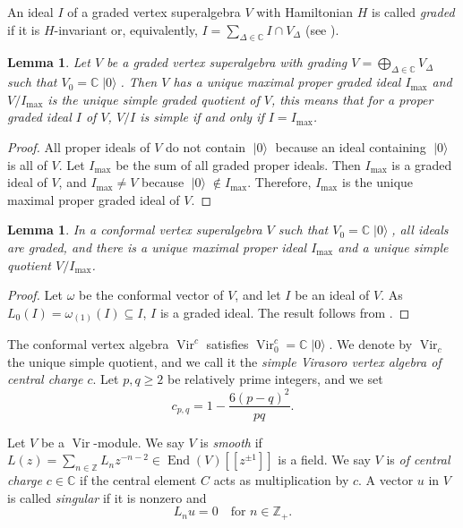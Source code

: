 \documentclass[a4paper, 12pt, reqno]{amsart}
\newtheorem{lemma}[theorem]{Lemma}
\theoremstyle{remark}
\DeclareMathOperator{\Vir}{Vir}
\DeclareMathOperator{\End}{End}
\DeclareMathOperator{\vac}{|0\rangle}
\begin{document}
An ideal $I$ of a graded vertex superalgebra $V$ with Hamiltonian $H$ is called \emph{graded} if it is $H$-invariant or, equivalently, $I = \sum_{\Delta \in \mathbb{C}}I \cap V_{\Delta}$ (see ).

\begin{lemma}
  \label{lmm:11}
  Let $V$ be a graded vertex superalgebra with grading $V = \bigoplus_{\Delta \in \mathbb{C}}V_{\Delta}$ such that $V_0 = \mathbb{C}\vac$.
  Then $V$ has a unique maximal proper graded ideal $I_{\max}$ and $V/I_{\max}$ is the unique simple graded quotient of $V$, this means that for a proper graded ideal $I$ of $V$, $V/I$ is simple if and only if $I = I_{\max}$.
\end{lemma}

\begin{proof}
  All proper ideals of $V$ do not contain $\vac$ because an ideal containing $\vac$ is all of $V$.
  Let $I_{\max}$ be the sum of all graded proper ideals.
  Then $I_{\max}$ is a graded ideal of $V$, and $I_{\max} \neq V$ because $\vac \notin I_{\max}$.
  Therefore, $I_{\max}$ is the unique maximal proper graded ideal of $V$.
\end{proof}

\begin{lemma}
  \label{lmm:12}
  In a conformal vertex superalgebra $V$ such that $V_0 = \mathbb{C}\vac$, all ideals are graded, and there is a unique maximal proper ideal $I_{\max}$ and a unique simple quotient $V/I_{\max}$.
\end{lemma}

\begin{proof}
  Let $\omega$ be the conformal vector of $V$, and let $I$ be an ideal of $V$.
  As $L_0(I) = \omega_{(1)}(I) \subseteq I$, $I$ is a graded ideal.
  The result follows from .
\end{proof}

The conformal vertex algebra $\Vir^c$ satisfies $\Vir^c_0 = \mathbb{C}\vac$.
We denote by $\Vir_c$ the unique simple quotient, and we call it the \emph{simple Virasoro vertex algebra of central charge $c$}.
Let $p, q \ge 2$ be relatively prime integers, and we set
\begin{equation*}
  c_{p, q} = 1 - \frac{6(p - q)^2}{pq}.
\end{equation*}

Let $V$ be a $\Vir$-module.
We say $V$ is \emph{smooth} if $L(z) = \sum_{n \in \mathbb{Z}}L_{n}z^{-n - 2} \in \End(V)[[z^{\pm1}]]$ is a field.
We say $V$ is \emph{of central charge $c \in \mathbb{C}$} if the central element $C$ acts as multiplication by $c$.
A vector $u$ in $V$ is called \emph{singular} if it is nonzero and
\begin{equation*}
  L_nu = 0 \quad \text{for $n \in \mathbb{Z}_+$}.
\end{equation*}
\end{document}
